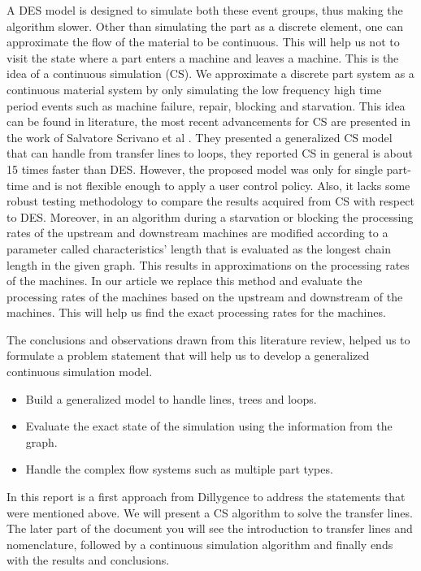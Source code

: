 A DES model is designed to simulate both these event groups, thus making the algorithm slower. Other than simulating the part as a discrete element, one can approximate the flow of the material to be continuous. This will help us not to visit the state where a part enters a machine and leaves a machine. This is the idea of a continuous simulation (CS). We approximate a discrete part system as a continuous material system by only simulating the low frequency high time period events such as machine failure, repair, blocking and starvation. This idea can be found in literature, the most recent advancements for CS are presented in the work of Salvatore Scrivano et al \cite{scrivano2023continuous}. They presented a generalized CS model that can handle from transfer lines to loops, they reported CS in general is about 15 times faster than DES. However, the proposed model was only for single part-time and is not flexible enough to apply a user control policy. Also, it lacks some robust testing methodology to compare the results acquired from CS with respect to DES. Moreover, in an algorithm during a starvation or blocking the processing rates of the upstream and downstream machines are modified according to a parameter called characteristics' length that is evaluated as the longest chain length in the given graph. This results in approximations on the processing rates of the machines. In our article we replace this method and evaluate the processing rates of the machines based on the upstream and downstream of the machines. This will help us find the exact processing rates for the machines. \par
The conclusions and observations drawn from this literature review, helped us to formulate a problem statement that will help us to develop a generalized continuous simulation model. \par
\begin{itemize}
    \item Build a generalized model to handle lines, trees and loops.
    \item Evaluate the exact state of the simulation using the information from the graph.
    \item Handle the complex flow systems such as multiple part types. 
\end{itemize}
In this report is a first approach from Dillygence to address the statements that were mentioned above. We will present a CS algorithm to solve the transfer lines. The later part of the document you will see the introduction to transfer lines and nomenclature, followed by a continuous simulation algorithm and finally ends with the results and conclusions. \par

